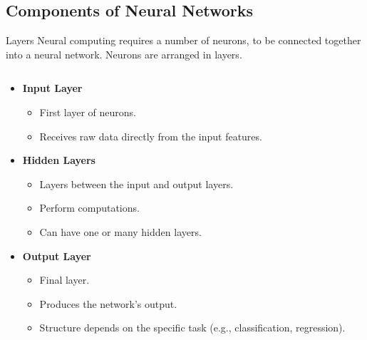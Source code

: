 \documentclass[10pt, hyperref={colorlinks = true,linkcolor = blue}]{beamer}
\begin{document}
{{{\subsection{Components of Neural Networks}
\begin{frame}{Layers}
Neural computing requires a
number of neurons, to be
connected together into a
neural network. Neurons are arranged in
layers. 
    \begin{columns}
        \begin{column}{0.6\textwidth}
\begin{itemize}
                \item \textbf{Input Layer}
                \begin{itemize}
                    \item First layer of neurons.
                    \item Receives raw data directly from the input features.
                \end{itemize}
                \item \textbf{Hidden Layers}
                \begin{itemize}
                    \item Layers between the input and output layers.
                    \item Perform computations.
                    \item Can have one or many hidden layers.
                \end{itemize}
                \item \textbf{Output Layer}
                \begin{itemize}
                    \item Final layer.
                    \item Produces the network's output.
                    \item Structure depends on the specific task (e.g., classification, regression).
                \end{itemize}
            \end{itemize}
        \end{column}
        

\end{columns}
\end{frame}}}}
\end{document}
